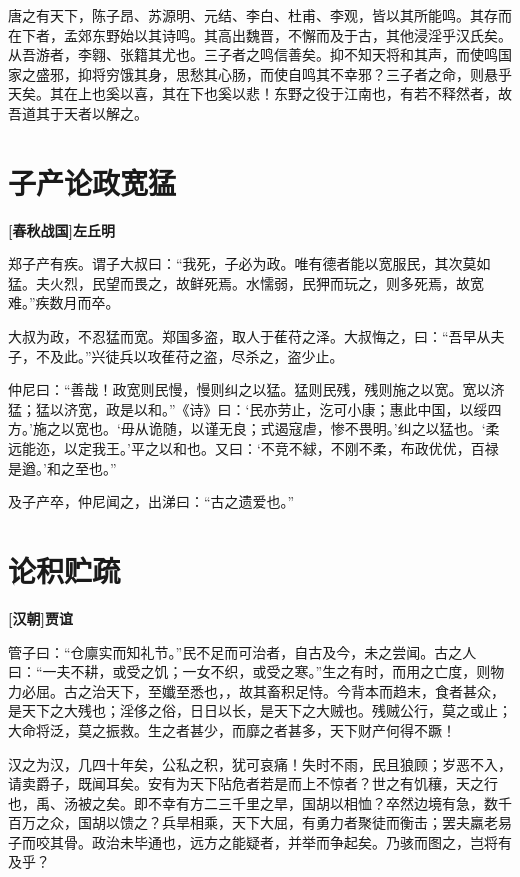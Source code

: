 \documentclass[UTF8,titlepage,oneside]{ctexbook}
\begin{document}
唐之有天下，陈子昂、苏源明、元结、李白、杜甫、李观，皆以其所能鸣。其存而在下者，孟郊东野始以其诗鸣。其高出魏晋，不懈而及于古，其他浸淫乎汉氏矣。从吾游者，李翱、张籍其尤也。三子者之鸣信善矣。抑不知天将和其声，而使鸣国家之盛邪，抑将穷饿其身，思愁其心肠，而使自鸣其不幸邪？三子者之命，则悬乎天矣。其在上也奚以喜，其在下也奚以悲！东野之役于江南也，有若不释然者，故吾道其于天者以解之。


\chapter*{子产论政宽猛}
\begin{center}
	\textbf{[春秋战国]左丘明}
\end{center}


郑子产有疾。谓子大叔曰：“我死，子必为政。唯有德者能以宽服民，其次莫如猛。夫火烈，民望而畏之，故鲜死焉。水懦弱，民狎而玩之，则多死焉，故宽难。”疾数月而卒。


大叔为政，不忍猛而宽。郑国多盗，取人于萑苻之泽。大叔悔之，曰：“吾早从夫子，不及此。”兴徒兵以攻萑苻之盗，尽杀之，盗少止。


仲尼曰：“善哉！政宽则民慢，慢则纠之以猛。猛则民残，残则施之以宽。宽以济猛；猛以济宽，政是以和。”《诗》曰：‘民亦劳止，汔可小康；惠此中国，以绥四方。’施之以宽也。‘毋从诡随，以谨无良；式遏寇虐，惨不畏明。’纠之以猛也。‘柔远能迩，以定我王。’平之以和也。又曰：‘不竞不絿，不刚不柔，布政优优，百禄是遒。’和之至也。”


及子产卒，仲尼闻之，出涕曰：“古之遗爱也。”



\chapter*{论积贮疏}
\begin{center}
	\textbf{[汉朝]贾谊}
\end{center}


管子曰：“仓廪实而知礼节。”民不足而可治者，自古及今，未之尝闻。古之人曰：“一夫不耕，或受之饥；一女不织，或受之寒。”生之有时，而用之亡度，则物力必屈。古之治天下，至孅至悉也，，故其畜积足恃。今背本而趋末，食者甚众，是天下之大残也；淫侈之俗，日日以长，是天下之大贼也。残贼公行，莫之或止；大命将泛，莫之振救。生之者甚少，而靡之者甚多，天下财产何得不蹶！


汉之为汉，几四十年矣，公私之积，犹可哀痛！失时不雨，民且狼顾；岁恶不入，请卖爵子，既闻耳矣。安有为天下阽危者若是而上不惊者？世之有饥穰，天之行也，禹、汤被之矣。即不幸有方二三千里之旱，国胡以相恤？卒然边境有急，数千百万之众，国胡以馈之？兵旱相乘，天下大屈，有勇力者聚徒而衡击；罢夫羸老易子而咬其骨。政治未毕通也，远方之能疑者，并举而争起矣。乃骇而图之，岂将有及乎？
\end{document}
